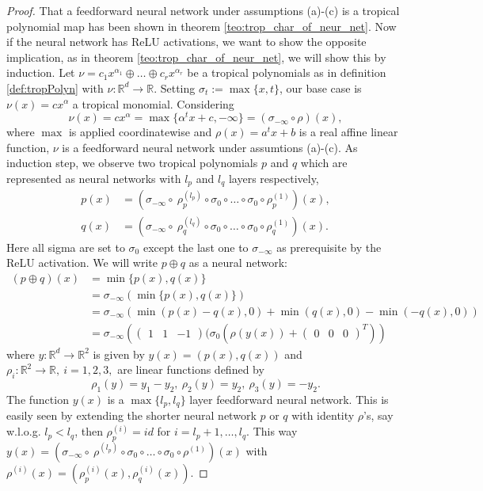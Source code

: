 \documentclass{article}
\theoremstyle{definition}
\begin{document}
\begin{proof}
That a feedforward neural network under assumptions (a)-(c) is a tropical polynomial map has been shown in theorem \ref{teo:trop_char_of_neur_net}. Now if the neural network has ReLU activations, we want to show the opposite implication, as in theorem \ref{teo:trop_char_of_neur_net}, we will show this by induction. Let $\nu=c_1x^{\alpha_1} \oplus \dots \oplus c_rx^{\alpha_r}$ be a tropical polynomials as in definition \ref{def:tropPolyn} with $\nu: \mathbb{R}^{d} \to \mathbb{R}$. Setting $\sigma_{t} := \max \{ x, t\}$, our base case is $\nu (x) = c x^{\alpha}$ a tropical monomial. Considering
$$\nu(x) = cx^{\alpha} = \max \{ \alpha^{t}x + c, -\infty \} = (\sigma_{- \infty} \circ \rho)(x),$$
where $\max$ is applied coordinatewise and $\rho(x) = a^{t}x + b$ is a real affine linear function, $\nu$ is a feedforward neural network under assumtions (a)-(c). As induction step, we observe two tropical polynomials $p$ and $q$ which are represented as neural networks with $l_{p}$ and $l_{q}$ layers respectively,
\begin{align*}
p(x) &= (\sigma_{- \infty} \circ \ \rho_{p}^{(l_{p})} \circ \sigma_{0} \circ \dots \circ \sigma_{0} \circ \rho_{p}^{(1)})(x), \\
q(x) &= (\sigma_{- \infty} \circ \ \rho_{q}^{(l_{q})} \circ \sigma_{0} \circ \dots \circ \sigma_{0} \circ \rho_{q}^{(1)})(x).
\end{align*}
Here all sigma are set to $\sigma_{0}$ except the last one to $\sigma_{- \infty}$ as prerequisite by the ReLU activation. We will write $p \oplus q$ as a neural network:
\begin{align*}
(p \oplus q)(x) 
&= \min \{ p(x), q(x) \} \\
&= \sigma_{- \infty }( \min \{ p(x), q(x) \} ) \\
&= \sigma_{- \infty }( \min(p(x)-q(x), 0) + \min(q(x), 0) - \min(-q(x), 0)) \\
&= \sigma_{- \infty }\left(\begin{pmatrix} 1 & 1 & -1 \end{pmatrix} (\sigma_{0}(\rho(y(x)) + \begin{pmatrix} 0 & 0 & 0 \end{pmatrix}^{T})\right)
\end{align*}
where $y:\mathbb{R}^{d} \to \mathbb{R}^{2}$ is given by $y(x)=(p(x),q(x))$ and $\rho_{i}:\mathbb{R}^{2} \to \mathbb{R}, \ i=1,2, 3,$ are linear functions defined by
$$\rho_{1}(y)=y_{1}-y_{2}, \ \rho_{2}(y)=y_{2}, \ \rho_{3}(y)= -y_{2}.$$
The function $y(x)$ is a $\max \{ l_{p}, l_{q} \}$ layer feedforward neural network. This is easily seen by extending the shorter neural network $p$ or $q$ with identity $\rho$'s, say w.l.o.g. $l_{p} < l_{q}$, then $\rho^{(i)}_{p} = id$ for $i = l_{p} + 1, \dots , l_{q}$. This way $y(x)=(\sigma_{- \infty} \circ \ \rho^{(l_{p})} \circ \sigma_{0} \circ \dots \circ \sigma_{0} \circ \rho^{(1)})(x)$ with $\rho^{(i)}(x) = (\rho_{p}^{(i)}(x), \rho_{q}^{(i)}(x))$.

\end{proof}
\end{document}
